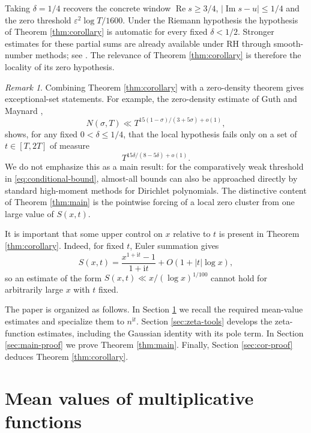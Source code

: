 \documentclass[12pt,reqno]{amsart}
\theoremstyle{remark}
\newtheorem{remark}[theorem]{Remark}
\numberwithin{equation}{section}
\newcommand{\Ree}{\operatorname{Re}}
\newcommand{\Imm}{\operatorname{Im}}
\newcommand{\ii}{\mathrm i}
\begin{document}
Taking $\delta=1/4$ recovers the concrete window $\Ree s\ge3/4$, $|\Imm s-u|\le1/4$ and the zero threshold $\varepsilon^2\log T/1600$.  Under the Riemann hypothesis the hypothesis of Theorem \ref{thm:corollary} is automatic for every fixed $\delta<1/2$.  Stronger estimates for these partial sums are already available under RH through smooth-number methods; see \cite[Theorem~5]{Yang24}.  The relevance of Theorem \ref{thm:corollary} is therefore the locality of its zero hypothesis.

\begin{remark}\label{rem:density}
Combining Theorem \ref{thm:corollary} with a zero-density theorem gives exceptional-set statements.  For example, the zero-density estimate of Guth and Maynard \cite{GM26},
\[
N(\sigma,T)\ll T^{15(1-\sigma)/(3+5\sigma)+o(1)},
\]
shows, for any fixed $0<\delta\le1/4$, that the local hypothesis fails only on a set of $t\in[T,2T]$ of measure
\[
T^{15\delta/(8-5\delta)+o(1)}.
\]
We do not emphasize this as a main result: for the comparatively weak threshold in \eqref{eq:conditional-bound}, almost-all bounds can also be approached directly by standard high-moment methods for Dirichlet polynomials.  The distinctive content of Theorem \ref{thm:main} is the pointwise forcing of a local zero cluster from one large value of $S(x,t)$.
\end{remark}

It is important that some upper control on $x$ relative to $t$ is present in Theorem \ref{thm:corollary}.  Indeed, for fixed $t$, Euler summation gives
\begin{equation}\label{eq:euler-large-x}
S(x,t)=\frac{x^{1+\ii t}-1}{1+\ii t}+O(1+|t|\log x),
\end{equation}
so an estimate of the form $S(x,t)\ll x/(\log x)^{1/100}$ cannot hold for arbitrarily large $x$ with $t$ fixed.

The paper is organized as follows.  In Section \ref{sec:mean-values} we recall the required mean-value estimates and specialize them to $n^{\ii t}$.  Section \ref{sec:zeta-tools} develops the zeta-function estimates, including the Gaussian identity with its pole term.  In Section \ref{sec:main-proof} we prove Theorem \ref{thm:main}.  Finally, Section \ref{sec:cor-proof} deduces Theorem \ref{thm:corollary}.

\section{Mean values of multiplicative functions}\label{sec:mean-values}
\end{document}
